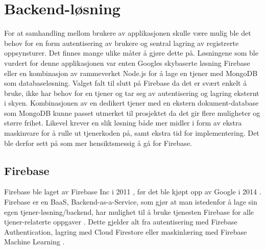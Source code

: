 \section{Backend-løsning}
For at samhandling mellom brukere av applikasjonen skulle være mulig ble det behov for en form autentisering av brukere og sentral lagring av registrerte oppsynsturer. Det finnes mange ulike måter å gjøre dette på. Løsningene som ble vurdert for denne applikasjonen var enten Googles skybaserte løsning Firebase \cite{Firebase} eller en kombinasjon av rammeverket Node.js \cite{NodeJs} for å lage en tjener med MongoDB \cite{MongoDBAtlasCloud} som databaseløsning. Valget falt til slutt på Firebase da det er svært enkelt å bruke, ikke har behov for en tjener og tar seg av autentisering og lagring eksternt i skyen. Kombinasjonen av en dedikert tjener med en ekstern dokument-database som MongoDB kunne passet utmerket til prosjektet da det gir flere muligheter og større frihet. Likevel krever en slik løsning både mer midler i form av ekstra maskinvare for å rulle ut tjenerkoden på, samt ekstra tid for implementering. Det ble derfor sett på som mer hensiktsmessig å gå for Firebase.

\subsection{Firebase}
Firebase ble laget av Firebase Inc i 2011 \cite{FirebaseCrunchbaseCompany}, før det ble kjøpt opp av Google i 2014 \cite{GoogleAcquiresFirebase}. Firebase er en BaaS, Backend-as-a-Service, som gjør at man istedenfor å lage sin egen tjener-løsning/backend, har mulighet til å bruke tjenesten Firebase for alle tjener-relaterte oppgaver \cite{WhatBaaSBackendasaService}. Dette gjelder alt fra autentisering med Firebase Authentication, lagring med Cloud Firestore eller maskinlæring med Firebase Machine Learning \cite{FirebaseProducts}.

